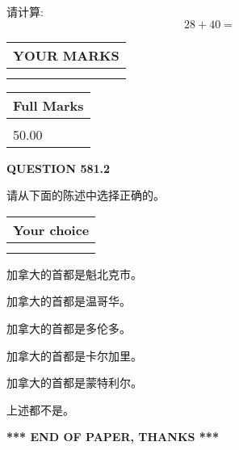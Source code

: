 \documentclass{ctexart}
\begin{document}
  
 
请计算:
\begin{equation}
28 +  %
40 = \nonumber
\end{equation}
 

 

 
  
\vspace{0.2in}
  
\noindent\begin{tabular}{|l|}
\hline
 YOUR MARKS  \\
\hline
 \\ 
 \\ 
\hline
\end{tabular}
\hspace{0.05in} \begin{tabular}{|l|}
\hline
 Full Marks  \\
\hline
 \\ 
50.00 \\
\hline
\end{tabular}
{\textbf{\Large{QUESTION
581.2 
}}}
  
  
请从下面的陈述中选择正确的。
  
  
\noindent\hspace{3.0in} \begin{tabular}{|l|}
\hline
Your choice \\
\hline
 \\ 
 \\ 
\hline
\end{tabular}
  
  
 
 
加拿大的首都是魁北克市。
 
 
加拿大的首都是温哥华。
 
 
加拿大的首都是多伦多。
 
 
加拿大的首都是卡尔加里。
 
 
加拿大的首都是蒙特利尔。
 
 
 上述都不是。
 
 
   
   
 \vspace{0.2in}
 
   
   
   
   
\vspace{1.0in} 
{\textbf{\large{ *** END OF PAPER, THANKS *** }}} 
   
\end{document}
